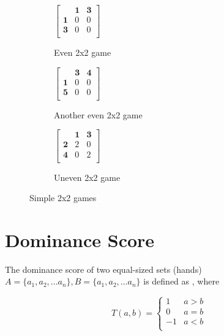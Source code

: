 \documentclass[11pt, oneside]{article} 	%
\begin{document}
\begin{figure}
\centering
\begin{subfigure}{.5\textwidth}
 \centering
$ \left[\begin{array}{ccc}
            & \mathbf{1} & \mathbf{3}\\ 
            \mathbf{1} & 0 & 0\\
            \mathbf{3} & 0 & 0\\
           \end{array}\right] 
$
 \caption{Even 2x2 game}
\label{fig:even_2x2}
\end{subfigure}

\begin{subfigure}{.5\textwidth}
 \centering
$ \left[\begin{array}{ccc}
            & \mathbf{3} & \mathbf{4}\\ 
            \mathbf{1} & 0 & 0\\
            \mathbf{5} & 0 & 0\\
           \end{array}\right] 
$
 \caption{Another even 2x2 game}
\label{fig:another_even_2x2}
\end{subfigure}

\begin{subfigure}{.5\textwidth}
 \centering
$ \left[\begin{array}{ccc}
            & \mathbf{1} & \mathbf{3}\\ 
            \mathbf{2} & 2 & 0\\
            \mathbf{4} & 0 & 2\\
           \end{array}\right] 
$
 \caption{Uneven 2x2 game}
\label{fig:uneven_2x2}
\end{subfigure}
\caption{Simple 2x2 games}
\label{fig:2x2}
\end{figure}


\section{Dominance Score}

The dominance score of two equal-sized sets (hands) $A = \{a_1, a_2, ... a_n\}, B = \{a_1, a_2, ... a_n\}$ is defined as , where	

\[  
T(a,b) = 
   \begin{cases}
    1 & a > b\\
    0 & a = b \\
    -1 & a < b \\ 
   \end{cases}
\]
\end{document}
